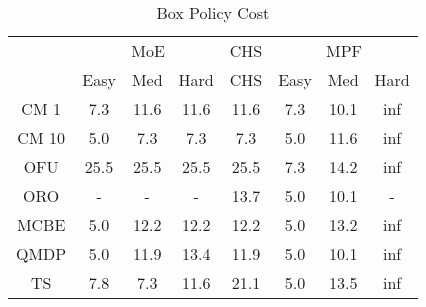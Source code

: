 \begin{table}[]
\centering
\begin{tabular}{|c|c|c|c|c|c|c|c|}
\hline
& \multicolumn{3}{c|}{MoE} & CHS & \multicolumn{3}{c|}{MPF} 
 \\ 
 & Easy & Med & Hard & CHS & Easy & Med & Hard\\\hline
CM 1 &   7.3 &  11.6 &  11.6 &  11.6 &   7.3 &  10.1 & inf\\
\hline
CM 10 &   5.0 &   7.3 &   7.3 &   7.3 &   5.0 &  11.6 & inf\\
\hline
OFU &  25.5 &  25.5 &  25.5 &  25.5 &   7.3 &  14.2 & inf\\
\hline
ORO & - & - & - &  13.7 &   5.0 &  10.1 & -\\
\hline
MCBE &   5.0 &  12.2 &  12.2 &  12.2 &   5.0 &  13.2 & inf\\
\hline
QMDP &   5.0 &  11.9 &  13.4 &  11.9 &   5.0 &  10.1 & inf\\
\hline
TS &   7.8 &   7.3 &  11.6 &  21.1 &   5.0 &  13.5 & inf\\
\hline
\end{tabular}
\caption{Box Policy Cost}
\label{tab:experiment_Box_cost}
\end{table}
